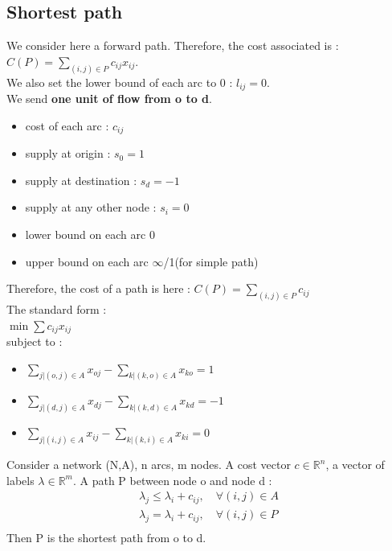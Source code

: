 \documentclass[../main.tex]{subfiles}
\begin{document}
\subsection{Shortest path}
We consider here a forward path. Therefore, the cost associated is : $C(P) = \sum_{(i,j)\in P} c_{ij}x_{ij}$.\\

We also set the lower bound of each arc to 0 : $l_{ij} = 0$.\\

We send \textbf{one unit of flow from o to d}.\begin{itemize}
    \item cost of each arc : $c_{ij}$\\
    \item supply at origin : $s_0=1$\\
    \item supply at destination : $s_d=-1$\\
    \item supply at any other node : $s_i=0$\\
    \item lower bound on each arc $ 0$\\
    \item upper bound on each arc $\infty$/1(for simple path)\\
\end{itemize}
Therefore, the cost of a path is here : $C(P) = \sum_{(i,j)\in P} c_{ij}$\\

The standard form : \\
$\min \sum c_{ij}x_{ij}$\\
subject to : \begin{itemize}
    \item $\sum_{j\lvert (o,j)\in A} x_{oj} - \sum_{k\lvert (k,o) \in A} x_{ko} = 1$\\
    \item $\sum_{j\lvert (d,j)\in A} x_{dj} - \sum_{k\lvert (k,d) \in A} x_{kd} = -1$\\
    \item $\sum_{j\lvert (i,j)\in A} x_{ij} - \sum_{k\lvert (k,i) \in A} x_{ki} = 0$\\
\end{itemize}

\begin{theoremen}
    Consider a network (N,A), n arcs, m nodes. A cost vector $c\in \mathbb{R}^n$, a vector of labels $\lambda \in \mathbb{R}^m$. A path P between node o and node d : \begin{equation}
        \begin{gathered}
            \lambda_j \leq \lambda_i +c_{ij}, \quad \forall (i,j)\in A\\
            \lambda_j = \lambda_i + c_{ij}, \quad \forall (i,j)\in P\\
        \end{gathered}
    \end{equation}
    Then P is the shortest path from o to d.\\
\end{theoremen}
\end{document}
